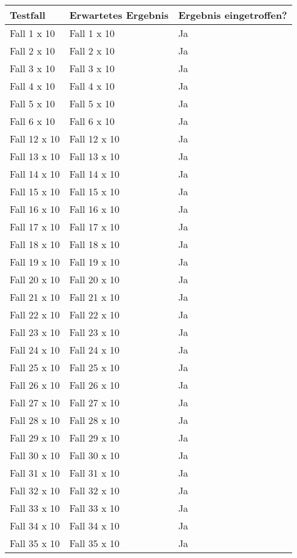 \begin{tabularx}{\textwidth}{|X|X|l|}
    \hline
    \textbf{Testfall} & \textbf{Erwartetes Ergebnis} & \textbf{Ergebnis eingetroffen?}\\
    \hline
    Fall 1 x 10 & Fall 1 x 10 & Ja\\
    \hline
    Fall 2 x 10 & Fall 2 x 10 & Ja\\
    \hline
    Fall 3 x 10 & Fall 3 x 10 & Ja\\
    \hline
    Fall 4 x 10 & Fall 4 x 10 & Ja\\
    \hline
    Fall 5 x 10 & Fall 5 x 10 & Ja\\
    \hline
    Fall 6 x 10 & Fall 6 x 10 & Ja\\
    \hline
    Fall 12 x 10 & Fall 12 x 10 & Ja\\
    \hline
    Fall 13 x 10 & Fall 13 x 10 & Ja\\
    \hline
    Fall 14 x 10 & Fall 14 x 10 & Ja\\
    \hline
    Fall 15 x 10 & Fall 15 x 10 & Ja\\
    \hline
    Fall 16 x 10 & Fall 16 x 10 & Ja\\
    \hline
    Fall 17 x 10 & Fall 17 x 10 & Ja\\
    \hline
    Fall 18 x 10 & Fall 18 x 10 & Ja\\
    \hline
    Fall 19 x 10 & Fall 19 x 10 & Ja\\
    \hline
    Fall 20 x 10 & Fall 20 x 10 & Ja\\
    \hline
    Fall 21 x 10 & Fall 21 x 10 & Ja\\
    \hline
    Fall 22 x 10 & Fall 22 x 10 & Ja\\
    \hline
    Fall 23 x 10 & Fall 23 x 10 & Ja\\
    \hline
    Fall 24 x 10 & Fall 24 x 10 & Ja\\
    \hline
    Fall 25 x 10 & Fall 25 x 10 & Ja\\
    \hline
    Fall 26 x 10 & Fall 26 x 10 & Ja\\
    \hline
    Fall 27 x 10 & Fall 27 x 10 & Ja\\
    \hline
    Fall 28 x 10 & Fall 28 x 10 & Ja\\
    \hline 
    Fall 29 x 10 & Fall 29 x 10 & Ja\\
    \hline
    Fall 30 x 10 & Fall 30 x 10 & Ja\\
    \hline
    Fall 31 x 10 & Fall 31 x 10 & Ja\\
    \hline
    Fall 32 x 10 & Fall 32 x 10 & Ja\\
    \hline
    Fall 33 x 10 & Fall 33 x 10 & Ja\\
    \hline
    Fall 34 x 10 & Fall 34 x 10 & Ja\\
    \hline
    Fall 35 x 10 & Fall 35 x 10 & Ja\\
    \hline
\end{tabularx}
